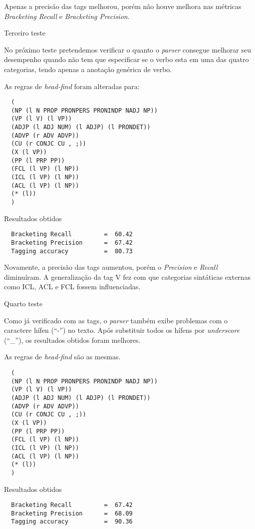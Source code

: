 \normalsize
Apenas a precisão das tags melhorou, porém não houve melhora nas métricas \emph{Bracketing Recall} e \emph{Bracketing Precision}.

Terceiro teste

No próximo teste pretendemos verificar o quanto o \emph{parser} consegue melhorar seu desempenho quando não tem que especificar se o verbo esta em uma das quatro categorias, tendo apenas a anotação genérica de verbo.

As regras de \emph{head-find} foram alteradas para:

\scriptsize
\begin{verbatim}
  (
  (NP (l N PROP PRONPERS PRONINDP NADJ NP))
  (VP (l V) (l VP))
  (ADJP (l ADJ NUM) (l ADJP) (l PRONDET))
  (ADVP (r ADV ADVP))
  (CU (r CONJC CU , ;))
  (X (l VP))
  (PP (l PRP PP))
  (FCL (l VP) (l NP))
  (ICL (l VP) (l NP))
  (ACL (l VP) (l NP))
  (* (l))
  )
\end{verbatim}

Resultados obtidos


\begin{verbatim}
  Bracketing Recall         =  60.42
  Bracketing Precision      =  67.42
  Tagging accuracy          =  80.73
\end{verbatim}

\normalsize
Novamente, a precisão das tags aumentou, porém o \emph{Precision} e \emph{Recall} diminuíram. A generalização da tag V fez com que categorias sintáticas externas como ICL, ACL e FCL fossem influenciadas.

Quarto teste

Como já verificado com as tags, o \emph{parser} também exibe problemas com o caractere hífen (``{-}'') no texto. Após substituir todos os hífens por \emph{underscore} (``\_''), os resultados obtidos foram melhores.

As regras de \emph{head-find} são as mesmas.

\scriptsize
\begin{verbatim}
  (
  (NP (l N PROP PRONPERS PRONINDP NADJ NP))
  (VP (l V) (l VP))
  (ADJP (l ADJ NUM) (l ADJP) (l PRONDET))
  (ADVP (r ADV ADVP))
  (CU (r CONJC CU , ;))
  (X (l VP))
  (PP (l PRP PP))
  (FCL (l VP) (l NP))
  (ICL (l VP) (l NP))
  (ACL (l VP) (l NP))
  (* (l))
  )
\end{verbatim}

Resultados obtidos

\begin{verbatim}
  Bracketing Recall         =  67.42
  Bracketing Precision      =  68.09
  Tagging accuracy          =  90.36
\end{verbatim}

